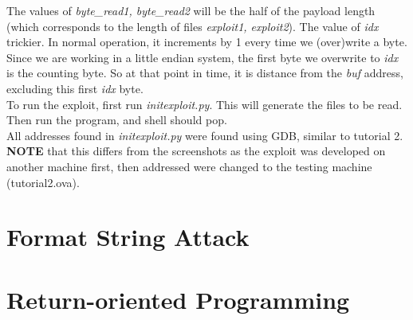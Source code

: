 \documentclass[12pt]{article}
\begin{document}
The values of \emph{byte\_read1, byte\_read2} will be the half of the payload length (which corresponds to the length of files \emph{exploit1, exploit2}). The value of \emph{idx} trickier. In normal operation, it increments by 1 every time we (over)write a byte. Since we are working in a little endian system, the first byte we overwrite to \emph{idx} is the counting byte. So at that point in time, it is distance from the \emph{buf} address, excluding this first \emph{idx} byte.\\

To run the exploit, first run \emph{initexploit.py}. This will generate the files to be read. Then run the program, and shell should pop.\\

All addresses found in \emph{initexploit.py} were found using GDB, similar to tutorial 2. \textbf{NOTE} that this differs from the screenshots as the exploit was developed on another machine first, then addressed were changed to the testing machine (tutorial2.ova).


\newpage
\section{Format String Attack}






\newpage
\section{Return-oriented Programming}
\end{document}
